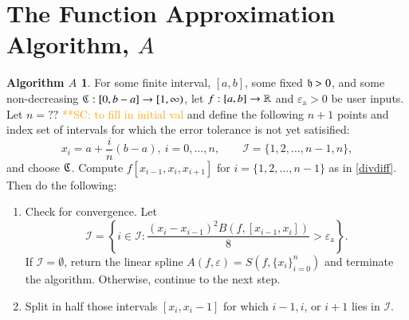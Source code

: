 \documentclass[review]{elsarticle}
\newcommand{\abstol}{\varepsilon_{\textrm{a}}}
\theoremstyle{definition}
\newtheorem*{algoA}{Algorithm $A$}
\newcommand{\scnote}[1]{ {\textcolor{orange}  {\mbox{**SC:} #1}}}
\begin{document}
\section{The Function Approximation Algorithm, $A$}\label{sec:fappx}

\begin{algoA}
For some finite interval, $[a,b]$, some fixed $\mathfrak{h} >0$, and some non-decreasing
$\mathfrak{C}:[0,b-a] \to [1, \infty)$, let $f:[a,b] \to \mathbb{R}$ and $\abstol >0$ be
user inputs. Let $n = ??$ \scnote{to fill in initial val} and define the
following $n+1$ points and index set of intervals for which the error tolerance
is not yet satisified: $$x_i=a+\frac{i}{n}(b-a), \ i=0,\ldots,n, \qquad
\mathcal{I} = \{1,2,\ldots,n-1,n\},$$ and choose $\mathfrak{C}$. Compute $f[x_{i-1},
x_{i}, x_{i+1}]$ for $i = \{1,2,\ldots,n-1\}$ as in \eqref{divdiff}. Then do the
following:
\begin{enumerate}[\hspace{8.5ex}]
\renewcommand{\labelenumi}{\textbf{Step \arabic{enumi}.}}
\item \label{stage1} Check for convergence. 
Let  
\[
\mathcal{I} = \left\{i \in \mathcal{I}: \frac{(x_i - x_{i-1})^2B(f,[x_{i-1},x_i])}{8}  > \abstol \right\}.
\]
If $\mathcal{I} = \emptyset$, return the linear spline $A(f,\varepsilon) = S(f, \{x_i\}_{i=0}^n)$ and terminate the algorithm.   
Otherwise, continue to the next step.
\item \label{stage2}  Split in half those intervals $[x_i,x_i-1]$ for which $i-1, i$, or $i+1$ lies in $\mathcal{I}$. %

\end{enumerate}
\end{algoA}
\end{document}
